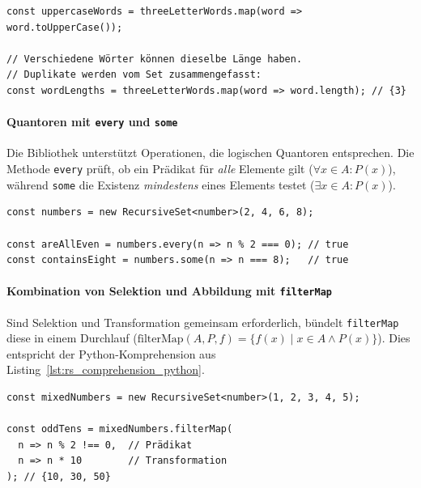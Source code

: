 \begin{listing}[ht]
    \caption{Abbildung mit \texttt{map}}
    \label{lst:rs_map_ts}
    \begin{verbatim}
const uppercaseWords = threeLetterWords.map(word => word.toUpperCase());

// Verschiedene Wörter können dieselbe Länge haben. 
// Duplikate werden vom Set zusammengefasst:
const wordLengths = threeLetterWords.map(word => word.length); // {3}
    \end{verbatim}
\end{listing}

\paragraph{Quantoren mit \texttt{every} und \texttt{some}}
Die Bibliothek unterstützt Operationen, die logischen Quantoren entsprechen. Die Methode \texttt{every} prüft, ob ein Prädikat für \emph{alle} Elemente gilt (\(\forall x \in A : P(x)\)), während \texttt{some} die Existenz \emph{mindestens} eines Elements testet (\(\exists x \in A : P(x)\)).

\begin{listing}[ht]
    \caption{Logische Quantoren mit \texttt{every} und \texttt{some}}
    \label{lst:rs_quantifiers_ts}
    \begin{verbatim}
const numbers = new RecursiveSet<number>(2, 4, 6, 8);

const areAllEven = numbers.every(n => n % 2 === 0); // true
const containsEight = numbers.some(n => n === 8);   // true
    \end{verbatim}
\end{listing}

\paragraph{Kombination von Selektion und Abbildung mit \texttt{filterMap}}
Sind Selektion und Transformation gemeinsam erforderlich, bündelt \texttt{filterMap} diese in einem Durchlauf (\(\mathrm{filterMap}(A, P, f) = \{f(x) \mid x \in A \land P(x)\}\)). Dies entspricht der Python-Komprehension aus Listing~\ref{lst:rs_comprehension_python}.

\begin{listing}[ht]
    \caption{Kombination aus Filter und Abbildung mit \texttt{filterMap}}
    \label{lst:rs_filtermap_ts}
    \begin{verbatim}
const mixedNumbers = new RecursiveSet<number>(1, 2, 3, 4, 5);

const oddTens = mixedNumbers.filterMap(
  n => n % 2 !== 0,  // Prädikat
  n => n * 10        // Transformation
); // {10, 30, 50}
    \end{verbatim}
\end{listing}

